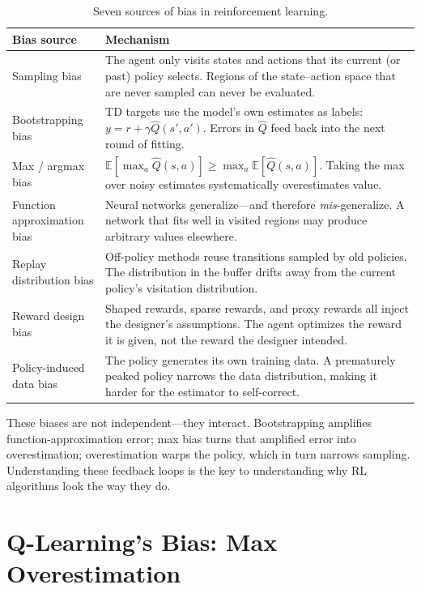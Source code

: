 \begin{table}[ht]
\centering
\caption{Seven sources of bias in reinforcement learning.}
\label{tab:bias-sources}
\begin{tabular}{@{}lp{8.5cm}@{}}
\toprule
\textbf{Bias source} & \textbf{Mechanism} \\
\midrule
Sampling bias &
  The agent only visits states and actions that its current (or past) policy
  selects.  Regions of the state--action space that are never sampled can never
  be evaluated. \\
Bootstrapping bias &
  TD targets use the model's own estimates as labels:
  $y = r + \gamma \hat{Q}(s',a')$.  Errors in $\hat{Q}$ feed back into the
  next round of fitting. \\
Max / argmax bias &
  $\mathbb{E}[\max_a \hat{Q}(s,a)] \geq \max_a \mathbb{E}[\hat{Q}(s,a)]$.
  Taking the max over noisy estimates systematically overestimates value. \\
Function approximation bias &
  Neural networks generalize---and therefore \emph{mis}-generalize.  A network
  that fits well in visited regions may produce arbitrary values elsewhere. \\
Replay distribution bias &
  Off-policy methods reuse transitions sampled by old policies.  The
  distribution in the buffer drifts away from the current policy's visitation
  distribution. \\
Reward design bias &
  Shaped rewards, sparse rewards, and proxy rewards all inject the designer's
  assumptions.  The agent optimizes the reward it is given, not the reward the
  designer intended. \\
Policy-induced data bias &
  The policy generates its own training data.  A prematurely peaked policy
  narrows the data distribution, making it harder for the estimator to
  self-correct. \\
\bottomrule
\end{tabular}
\end{table}

These biases are not independent---they interact.  Bootstrapping amplifies
function-approximation error; max bias turns that amplified error into
overestimation; overestimation warps the policy, which in turn narrows sampling.
Understanding these feedback loops is the key to understanding why RL algorithms
look the way they do.


\section{Q-Learning's Bias: Max Overestimation}
\label{sec:q-bias}

